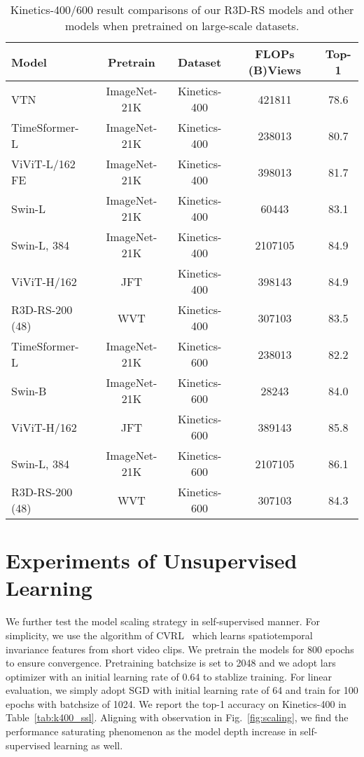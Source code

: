 \documentclass{article} \usepackage{iclr2021_conference,times}
\begin{document}
\begin{table}[h]
\centering
\begin{tabular}{l | c | c | c |c}
\toprule
Model            & Pretrain & Dataset & FLOPs (B)Views & Top-1  \\ 
\midrule
VTN~\cite{Neimark2021VideoTN} & ImageNet-21K& Kinetics-400 & 421811 & 78.6 \\
TimeSformer-L~\cite{Bertasius2021IsSA} & ImageNet-21K& Kinetics-400 & 238013 & 80.7 \\
ViViT-L/162 FE~\cite{Arnab2021ViViTAV} & ImageNet-21K &  Kinetics-400 & 398013 & 81.7 \\ 
Swin-L~\cite{liu2021videoswin} & ImageNet-21K&  Kinetics-400 & 60443 & 83.1 \\
Swin-L, 384~\cite{liu2021videoswin} & ImageNet-21K&  Kinetics-400 & 2107105 & 84.9 \\
ViViT-H/162~\cite{Arnab2021ViViTAV} & JFT &  Kinetics-400 & 398143 & 84.9 \\
\midrule
R3D-RS-200 (48) & WVT      & Kinetics-400 & 307103 & 83.5 \\ 
\midrule
\midrule
TimeSformer-L~\cite{Bertasius2021IsSA} & ImageNet-21K& Kinetics-600 & 238013 & 82.2 \\
Swin-B~\cite{liu2021videoswin} & ImageNet-21K&  Kinetics-600 & 28243 & 84.0 \\
ViViT-H/162~\cite{Arnab2021ViViTAV}& JFT &  Kinetics-600 & 389143 & 85.8 \\
Swin-L, 384~\cite{liu2021videoswin} & ImageNet-21K&  Kinetics-600 & 2107105 & 86.1 \\
\midrule
R3D-RS-200 (48) & WVT      & Kinetics-600 & 307103 &84.3 \\ 
\bottomrule
\end{tabular}
\vspace{1mm}
\caption{\small{
Kinetics-400/600 result comparisons of our R3D-RS models and other models when pretrained on large-scale datasets.}}
\label{tab:wvt_pretrain_results_sv} 
\end{table}

\section{Experiments of Unsupervised Learning}
We further test the model scaling strategy in self-supervised manner. For simplicity, we use the algorithm of CVRL~\cite{qian2021spatiotemporal} which learns spatiotemporal invariance features from short video clips. We pretrain the models for 800 epochs to ensure convergence. Pretraining batchsize is set to 2048 and we adopt lars optimizer with an initial learning rate of 0.64 to stablize training. For linear evaluation, we simply adopt SGD with initial learning rate of 64 and train for 100 epochs with batchsize of 1024. We report the top-1 accuracy on Kinetics-400 in Table~\ref{tab:k400_ssl}. Aligning with observation in Fig.~\ref{fig:scaling}, we find the performance saturating phenomenon as the model depth increase in self-supervised learning as well. 
\end{document}
